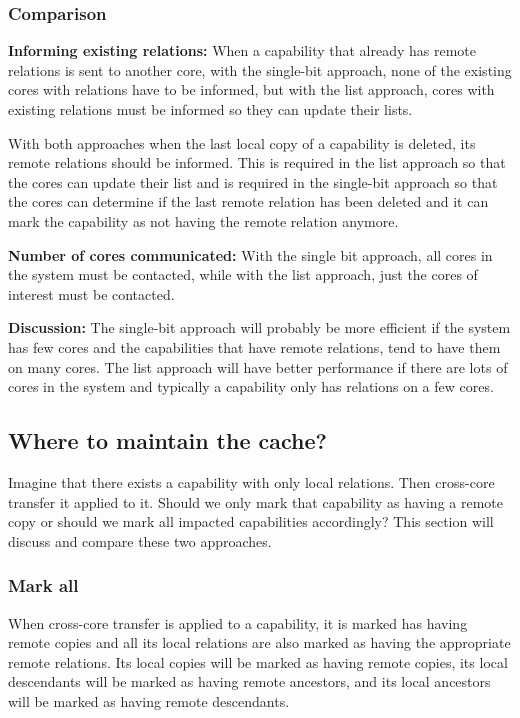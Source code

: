 \documentclass[a4paper,twoside]{report} %
\begin{document}
\subsubsection{Comparison}
\textbf{Informing existing relations:} When a capability that already
has remote relations is sent to another core, with the single-bit
approach, none of the existing cores with relations have to be
informed, but with the list approach, cores with existing relations
must be informed so they can update their lists.

With both approaches when the last local copy of a capability is
deleted, its remote relations should be informed. This is required in
the list approach so that the cores can update their list and is
required in the single-bit approach so that the cores can determine if
the last remote relation has been deleted and it can mark the
capability as not having the remote relation anymore.

\textbf{Number of cores communicated:} With the single bit approach,
all cores in the system must be contacted, while with the list
approach, just the cores of interest must be contacted.

\textbf{Discussion:} The single-bit approach will probably be more
efficient if the system has few cores and the capabilities that have
remote relations, tend to have them on many cores. The list approach
will have better performance if there are lots of cores in the system
and typically a capability only has relations on a few cores.

\subsection{Where to maintain the cache?}\label{subsec:where}
Imagine that there exists a capability with only local relations. Then
cross-core transfer it applied to it. Should we only mark that
capability as having a remote copy or should we mark all impacted
capabilities accordingly? This section will discuss and compare these
two approaches.

\subsubsection{Mark all}
When cross-core transfer is applied to a capability, it is marked has
having remote copies and all its local relations are also marked as
having the appropriate remote relations. Its local copies will be
marked as having remote copies, its local descendants will be marked
as having remote ancestors, and its local ancestors will be marked as
having remote descendants.
\end{document}
